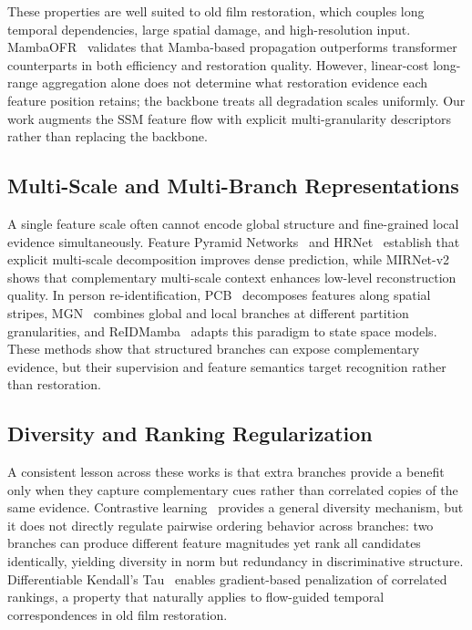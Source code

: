 These properties are well suited to old film restoration, which couples long temporal dependencies, large spatial damage, and high-resolution input. MambaOFR~\cite{mao2025mambaofr} validates that Mamba-based propagation outperforms transformer counterparts in both efficiency and restoration quality. However, linear-cost long-range aggregation alone does not determine what restoration evidence each feature position retains; the backbone treats all degradation scales uniformly. Our work augments the SSM feature flow with explicit multi-granularity descriptors rather than replacing the backbone.

\subsection{Multi-Scale and Multi-Branch Representations}
\label{subsec:multigran}

A single feature scale often cannot encode global structure and fine-grained local evidence simultaneously. Feature Pyramid Networks~\cite{lin2017fpn} and HRNet~\cite{wang2021hrnet} establish that explicit multi-scale decomposition improves dense prediction, while MIRNet-v2~\cite{zamir2022mirnetv2} shows that complementary multi-scale context enhances low-level reconstruction quality. In person re-identification, PCB~\cite{sun2018pcb} decomposes features along spatial stripes, MGN~\cite{wang2018mgn} combines global and local branches at different partition granularities, and ReIDMamba~\cite{gu2025reidmamba} adapts this paradigm to state space models. These methods show that structured branches can expose complementary evidence, but their supervision and feature semantics target recognition rather than restoration.

\subsection{Diversity and Ranking Regularization}
\label{subsec:diversity_ranking}

A consistent lesson across these works is that extra branches provide a benefit only when they capture complementary cues rather than correlated copies of the same evidence. Contrastive learning~\cite{chen2020mocov2} provides a general diversity mechanism, but it does not directly regulate pairwise ordering behavior across branches: two branches can produce different feature magnitudes yet rank all candidates identically, yielding diversity in norm but redundancy in discriminative structure. Differentiable Kendall's Tau~\cite{zheng2023diffkendall} enables gradient-based penalization of correlated rankings, a property that naturally applies to flow-guided temporal correspondences in old film restoration.

